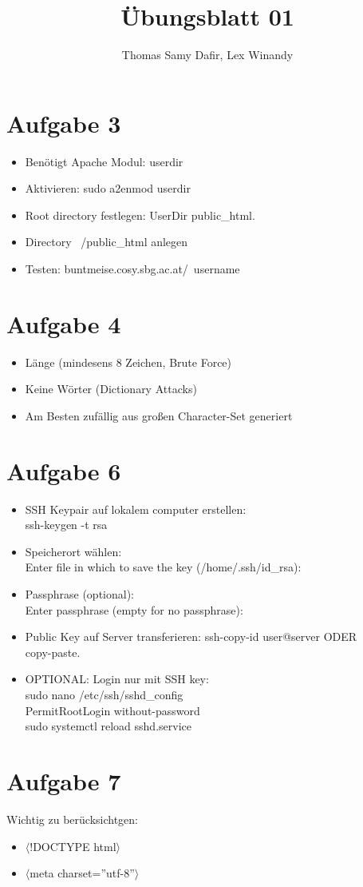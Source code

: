 \documentclass[12pt, a4paper]{report}
\title{Übungsblatt 01}
\author{Thomas Samy Dafir, Lex Winandy}
\date{}
\begin{document}
\maketitle

\section*{Aufgabe 3}
\begin{itemize}
	\item Benötigt Apache Modul: userdir
	\item Aktivieren: sudo a2enmod userdir
	\item Root directory festlegen: UserDir public\_html.
	\item Directory ~/public\_html anlegen
	\item Testen: buntmeise.cosy.sbg.ac.at/~username
\end{itemize}

\section*{Aufgabe 4}
\begin{itemize}
	\item Länge (mindesens 8 Zeichen, Brute Force)
	\item Keine Wörter (Dictionary Attacks)
	\item Am Besten zufällig aus großen Character-Set generiert 
\end{itemize}


\section*{Aufgabe 6}
\begin{itemize}
	\item SSH Keypair auf lokalem computer erstellen:\\
	ssh-keygen -t rsa
	\item Speicherort wählen:\\
	Enter file in which to save the key (/home/.ssh/id\_rsa):
	\item Passphrase (optional):\\
	Enter passphrase (empty for no passphrase):
	\item Public Key auf Server transferieren:
	ssh-copy-id user@server ODER \\
	copy-paste.
	\item OPTIONAL: Login nur mit SSH key:\\
	sudo nano /etc/ssh/sshd\_config\\
	PermitRootLogin without-password\\
	sudo systemctl reload sshd.service
\end{itemize}

\section*{Aufgabe 7}{\tiny }
Wichtig zu berücksichtgen:
\begin{itemize}
	\item $\langle$!DOCTYPE html$\rangle$
	\item $\langle$meta charset=''utf-8''$\rangle$
\end{itemize}
\end{document}
